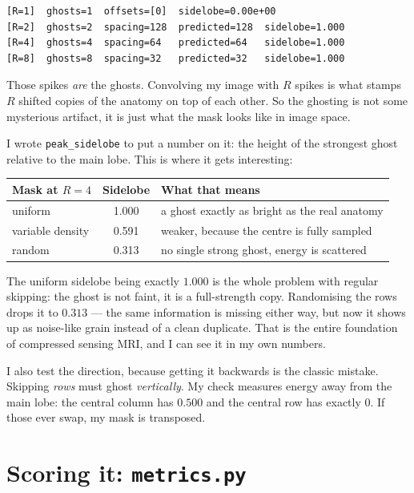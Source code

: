 \documentclass[11pt,a4paper]{article}
\begin{document}
\begin{lstlisting}
[R=1]  ghosts=1  offsets=[0]  sidelobe=0.00e+00
[R=2]  ghosts=2  spacing=128  predicted=128  sidelobe=1.000
[R=4]  ghosts=4  spacing=64   predicted=64   sidelobe=1.000
[R=8]  ghosts=8  spacing=32   predicted=32   sidelobe=1.000
\end{lstlisting}

Those spikes \emph{are} the ghosts. Convolving my image with $R$ spikes is what
stamps $R$ shifted copies of the anatomy on top of each other. So the ghosting is
not some mysterious artifact, it is just what the mask looks like in image space.

I wrote \texttt{peak\_sidelobe} to put a number on it: the height of the
strongest ghost relative to the main lobe. This is where it gets interesting:

\begin{center}
\begin{tabular}{@{}lcl@{}}
\toprule
\textbf{Mask at $R=4$} & \textbf{Sidelobe} & \textbf{What that means} \\
\midrule
uniform & 1.000 & a ghost exactly as bright as the real anatomy \\
variable density & 0.591 & weaker, because the centre is fully sampled \\
random & 0.313 & no single strong ghost, energy is scattered \\
\bottomrule
\end{tabular}
\end{center}

The uniform sidelobe being exactly $1.000$ is the whole problem with regular
skipping: the ghost is not faint, it is a full-strength copy. Randomising the
rows drops it to $0.313$ --- the same information is missing either way, but now
it shows up as noise-like grain instead of a clean duplicate. That is the entire
foundation of compressed sensing MRI, and I can see it in my own numbers.

I also test the direction, because getting it backwards is the classic mistake.
Skipping \emph{rows} must ghost \emph{vertically}. My check measures energy away
from the main lobe: the central column has $0.500$ and the central row has
exactly $0$. If those ever swap, my mask is transposed.

\section{Scoring it: \texttt{metrics.py}}
\end{document}
